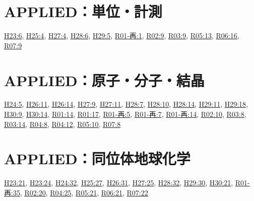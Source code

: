 \section{APPLIED：単位・計測}
\hyperref[q:h23-reg-applied-06]{H23:6}, \hyperref[q:h25-reg-applied-04]{H25:4}, \hyperref[q:h27-reg-applied-04]{H27:4}, \hyperref[q:h28-reg-applied-06]{H28:6}, \hyperref[q:h29-reg-applied-05]{H29:5}, \hyperref[q:r01-ret-applied-01]{R01-再:1}, \hyperref[q:r02-reg-applied-09]{R02:9}, \hyperref[q:r03-reg-applied-09]{R03:9}, \hyperref[q:r05-reg-applied-13]{R05:13}, \hyperref[q:r06-reg-applied-16]{R06:16}, \hyperref[q:r07-reg-applied-09]{R07:9}
\section{APPLIED：原子・分子・結晶}
\hyperref[q:h24-reg-applied-05]{H24:5}, \hyperref[q:h26-reg-applied-11]{H26:11}, \hyperref[q:h26-reg-applied-14]{H26:14}, \hyperref[q:h27-reg-applied-09]{H27:9}, \hyperref[q:h27-reg-applied-11]{H27:11}, \hyperref[q:h28-reg-applied-07]{H28:7}, \hyperref[q:h28-reg-applied-10]{H28:10}, \hyperref[q:h28-reg-applied-14]{H28:14}, \hyperref[q:h29-reg-applied-11]{H29:11}, \hyperref[q:h29-reg-applied-18]{H29:18}, \hyperref[q:h30-reg-applied-09]{H30:9}, \hyperref[q:h30-reg-applied-14]{H30:14}, \hyperref[q:r01-reg-applied-14]{R01:14}, \hyperref[q:r01-reg-applied-17]{R01:17}, \hyperref[q:r01-ret-applied-05]{R01-再:5}, \hyperref[q:r01-ret-applied-07]{R01-再:7}, \hyperref[q:r01-ret-applied-14]{R01-再:14}, \hyperref[q:r02-reg-applied-10]{R02:10}, \hyperref[q:r03-reg-applied-08]{R03:8}, \hyperref[q:r03-reg-applied-14]{R03:14}, \hyperref[q:r04-reg-applied-08]{R04:8}, \hyperref[q:r04-reg-applied-12]{R04:12}, \hyperref[q:r05-reg-applied-10]{R05:10}, \hyperref[q:r07-reg-applied-08]{R07:8}
\section{APPLIED：同位体地球化学}
\hyperref[q:h23-reg-applied-21]{H23:21}, \hyperref[q:h23-reg-applied-24]{H23:24}, \hyperref[q:h24-reg-applied-32]{H24:32}, \hyperref[q:h25-reg-applied-27]{H25:27}, \hyperref[q:h26-reg-applied-31]{H26:31}, \hyperref[q:h27-reg-applied-25]{H27:25}, \hyperref[q:h28-reg-applied-32]{H28:32}, \hyperref[q:h29-reg-applied-30]{H29:30}, \hyperref[q:h30-reg-applied-21]{H30:21}, \hyperref[q:r01-ret-applied-35]{R01-再:35}, \hyperref[q:r02-reg-applied-20]{R02:20}, \hyperref[q:r04-reg-applied-25]{R04:25}, \hyperref[q:r05-reg-applied-21]{R05:21}, \hyperref[q:r06-reg-applied-21]{R06:21}, \hyperref[q:r07-reg-applied-22]{R07:22}
